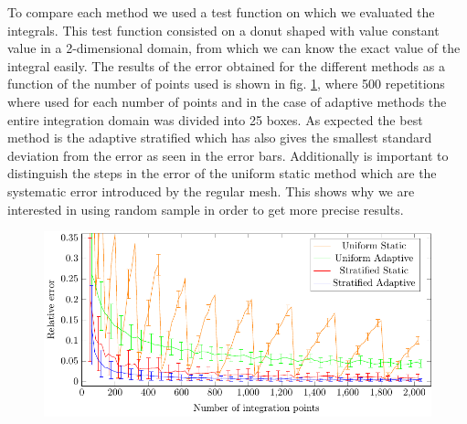 To compare each method we used a test function on which we evaluated the integrals.
This test function consisted on a donut shaped with value constant value in a 2-dimensional domain, from which
we can know the exact value of the integral easily. The results
of the error obtained for the different methods as a function of the number of points used is shown in fig. \ref{mc_errs},
 where 500 repetitions where used for each number of points and in the case of adaptive methods the entire integration
 domain was divided into 25 boxes. As
expected the best method is the adaptive stratified which has also gives the smallest standard deviation from the error as seen in the error bars.
Additionally is important to distinguish the steps in the error of the uniform static
method which are the systematic error introduced by the regular mesh. This shows why we are interested in using random sample in order to
get more precise results.
\begin{figure}
  \begin{center}
  \includegraphics[scale=1 ]{graphs/graphtest.pdf}
  \caption{}
  \label{mc_errs}
  \end{center}
\end{figure}
